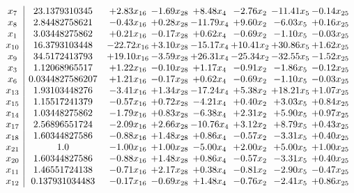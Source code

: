 \documentclass[8pt]{article}
\begin{document}
\[\begin{array}{c| c c@{\hskip 2pt} c@{\hskip 2pt} c@{\hskip 2pt} c@{\hskip 2pt} c@{\hskip 2pt} c@{\hskip 2pt} }
 x_{7}   &  23.1379310345 & +  2.83 x_{16} & -1.69 x_{28} & +  8.48 x_{4} & -2.76 x_{2} & -11.41 x_{5} & -0.14 x_{25}\\
 x_{8}   &  2.84482758621 & -0.43 x_{16} & +  0.28 x_{28} & -11.79 x_{4} & +  9.60 x_{2} & -6.03 x_{5} & +  0.16 x_{25}\\
 x_{1}   &  3.03448275862 & +  0.21 x_{16} & -0.17 x_{28} & +  0.62 x_{4} & -0.69 x_{2} & -1.10 x_{5} & -0.03 x_{25}\\
 x_{10}   &  16.3793103448 & -22.72 x_{16} & +  3.10 x_{28} & -15.17 x_{4} & + 10.41 x_{2} & + 30.86 x_{5} & +  1.62 x_{25}\\
 x_{9}   &  34.5172413793 & + 19.10 x_{16} & -3.59 x_{28} & + 26.31 x_{4} & -25.34 x_{2} & -32.55 x_{5} & -1.52 x_{25}\\
 x_{3}   &  1.12068965517 & +  1.22 x_{16} & -0.10 x_{28} & +  1.17 x_{4} & -0.91 x_{2} & -1.86 x_{5} & -0.12 x_{25}\\
 x_{6}   &  0.0344827586207 & +  1.21 x_{16} & -0.17 x_{28} & +  0.62 x_{4} & -0.69 x_{2} & -1.10 x_{5} & -0.03 x_{25}\\
 x_{13}   &  1.93103448276 & -3.41 x_{16} & +  1.34 x_{28} & -17.24 x_{4} & +  5.38 x_{2} & + 18.21 x_{5} & +  1.07 x_{25}\\
 x_{15}   &  1.15517241379 & -0.57 x_{16} & +  0.72 x_{28} & -4.21 x_{4} & +  0.40 x_{2} & +  3.03 x_{5} & +  0.84 x_{25}\\
 x_{14}   &  1.03448275862 & -1.79 x_{16} & +  0.83 x_{28} & -6.38 x_{4} & +  2.31 x_{2} & +  5.90 x_{5} & +  0.97 x_{25}\\
 x_{17}   &  2.56896551724 & -2.09 x_{16} & +  2.66 x_{28} & -10.76 x_{4} & +  3.12 x_{2} & +  8.79 x_{5} & +  0.43 x_{25}\\
 x_{18}   &  1.60344827586 & -0.88 x_{16} & +  1.48 x_{28} & +  0.86 x_{4} & -0.57 x_{2} & -3.31 x_{5} & +  0.40 x_{25}\\
 x_{21}   &  1.0 & -1.00 x_{16} & +  1.00 x_{28} & -5.00 x_{4} & +  2.00 x_{2} & +  5.00 x_{5} & +  1.00 x_{25}\\
 x_{20}   &  1.60344827586 & -0.88 x_{16} & +  1.48 x_{28} & +  0.86 x_{4} & -0.57 x_{2} & -3.31 x_{5} & +  0.40 x_{25}\\
 x_{11}   &  1.46551724138 & -0.71 x_{16} & +  2.17 x_{28} & +  0.38 x_{4} & -0.81 x_{2} & -2.90 x_{5} & -0.47 x_{25}\\
 x_{12}   &  0.137931034483 & -0.17 x_{16} & -0.69 x_{28} & +  1.48 x_{4} & -0.76 x_{2} & -2.41 x_{5} & +  0.86 x_{25}\\

\end{array}\]
\end{document}
